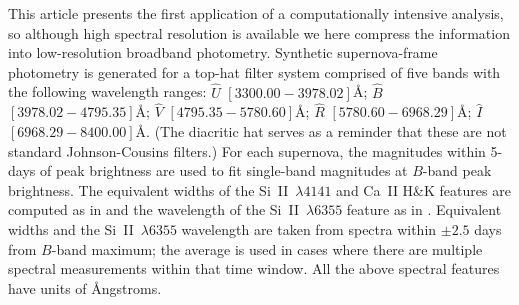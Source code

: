 \documentclass{aastex61}   	%
\begin{document}
This article presents the first application of a computationally intensive analysis, so although  high spectral resolution
is available we here compress the information into low-resolution broadband photometry. 
Synthetic supernova-frame photometry is generated for a top-hat filter system
comprised of five 
bands with the following wavelength ranges: ${\hat{U}}$ $[3300.00 - 3978.02]$\AA;
${\hat{B}}$ $[3978.02-4795.35]$\AA;
$\hat{V}$ $[4795.35-5780.60]$\AA;
$\hat{R}$ $[5780.60-6968.29]$\AA;
$\hat{I}$ $[6968.29-8400.00]$\AA.
(The diacritic hat serves as a reminder that these are not standard Johnson-Cousins filters.)
For each supernova, the magnitudes within 5-days of peak brightness are used to fit single-band magnitudes
at $B$-band peak brightness.
The equivalent widths of the Si~II~$\lambda 4141$ and Ca~II H\&K features are computed as
in \citet{2008A&A...477..717B} and the 
wavelength of the Si~II~$\lambda 6355$ feature
as in \citet{chotard:thesis, 2017Chotard}.
Equivalent widths and the
Si~II~$\lambda 6355$ wavelength are taken from spectra  within $\pm 2.5$ days from $B$-band maximum;
the average is used  in cases where there are multiple spectral measurements within that time window.
\color{red}
All the above spectral features have units of \AA ngstroms.
\color{black}
\end{document}
